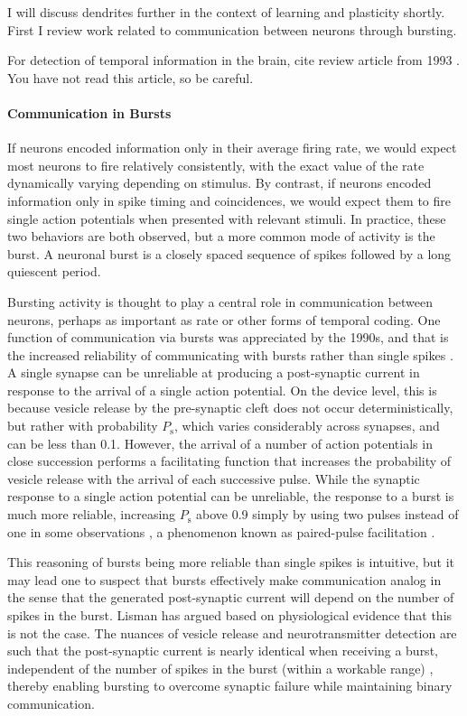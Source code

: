 \documentclass[twocolumn]{article}
\begin{document}
I will discuss dendrites further in the context of learning and plasticity shortly. First I review work related to communication between neurons through bursting.

\vspace{3em}
For detection of temporal information in the brain, cite review article from 1993 \cite{ca1993}. You have not read this article, so be careful.

\paragraph{Communication in Bursts}
If neurons encoded information only in their average firing rate, we would expect most neurons to fire relatively consistently, with the exact value of the rate dynamically varying depending on stimulus. By contrast, if neurons encoded information only in spike timing and coincidences, we would expect them to fire single action potentials when presented with relevant stimuli. In practice, these two behaviors are both observed, but a more common mode of activity is the burst. A neuronal burst is a closely spaced sequence of spikes followed by a long quiescent period. 

Bursting activity is thought to play a central role in communication between neurons, perhaps as important as rate or other forms of temporal coding. One function of communication via bursts was appreciated by the 1990s, and that is the increased reliability of communicating with bursts rather than single spikes \cite{li1997}. A single synapse can be unreliable at producing a post-synaptic current in response to the arrival of a single action potential. On the device level, this is because vesicle release by the pre-synaptic cleft does not occur deterministically, but rather with probability $P_{\mathrm{s}}$, which varies considerably across synapses, and can be less than 0.1. However, the arrival of a number of action potentials in close succession performs a facilitating function that increases the probability of vesicle release with the arrival of each successive pulse. While the synaptic response to a single action potential can be unreliable, the response to a burst is much more reliable, increasing $P_{\mathrm{s}}$ above 0.9 simply by using two pulses instead of one in some observations \cite{fomc1991,degu1996}, a phenomenon known as paired-pulse facilitation \cite{li1997}. 

This reasoning of bursts being more reliable than single spikes is intuitive, but it may lead one to suspect that bursts effectively make communication analog in the sense that the generated post-synaptic current will depend on the number of spikes in the burst. Lisman has argued based on physiological evidence that this is not the case. The nuances of vesicle release and neurotransmitter detection are such that the post-synaptic current is nearly identical when receiving a burst, independent of the number of spikes in the burst (within a workable range) \cite{li1997}, thereby enabling bursting to overcome synaptic failure while maintaining binary communication.
\end{document}
